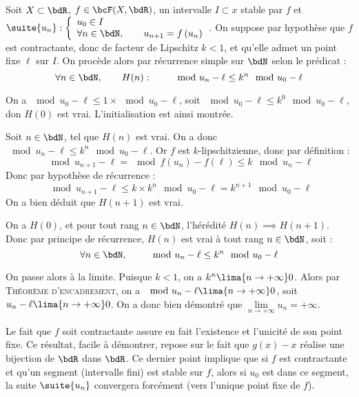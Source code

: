 \documentclass[a4paper,french,bookmarks]{article}
\begin{document}
\begin{nproof}
    Soit $X \subset \bdR$, $f \in \bcF(X, \bdR)$, un intervalle $I \subset x$ stable par $f$ et $\suite{u_n} : \left\lbrace\begin{array}{l}
        u_0 \in I  \\
        \forall n \in \bdN,\qquad u_{n+1} = f\left(u_n\right) 
    \end{array}\right.$. On suppose par hypothèse que $f$ est contractante, donc de facteur de Lipschitz $k < 1$, et qu'elle admet un point fixe $\ell$ sur $I$. On procède alors par récurrence simple sur $\bdN$ selon le prédicat :
    \[ \forall n \in \bdN,\qquad H(n):\qquad \mod{u_n - \ell} \leq k^n\mod{u_0 - \ell}\]
    \begin{enumerate}
        \itt On a $\mod{u_0 - \ell} \leq 1 \times \mod{u_0 - \ell}$, soit $\mod{u_0 - \ell} \leq k^0\mod{u_0 - \ell}$, don $H(0)$ est vrai. L'initialisation est ainsi montrée.
        
        \itt Soit $n \in \bdN$, tel que $H(n)$ est vrai. On a donc $\mod{u_n - \ell} \leq k^n\mod{u_0 - \ell}$. Or $f$ est $k$-lipschitzienne, donc par définition :
        \[ \mod{u_{n+1} - \ell} = \mod{f\left(u_n\right) - f(\ell)} \leq k\mod{u_n - \ell}\]
        Donc par hypothèse de récurrence :
        \[ \mod{u_{n+1} - \ell} \leq k\times k^n\mod{u_0 - \ell} = k^{n+1}\mod{u_0 - \ell}\]
        On a bien déduit que $H(n+1)$ est vrai.
        
        \itt On a $H(0)$, et pour tout rang $n \in \bdN$, l'hérédité $H(n) \implies H(n+1)$. Donc par principe de récurrence, $H(n)$ est vrai à tout rang $n \in \bdN$, soit :
        \[ \forall n \in \bdN, \qquad \mod{u_n - \ell} \leq k^n\mod{u_0 - \ell}\]
    \end{enumerate}
    
    On passe alors à la limite. Puisque $k < 1$, on a $k^n \lima{n \to +\infty} 0$. Alors par \textsc{Théorème d'encadrement}, on a $\mod{u_n - \ell} \lima{n \to +\infty} 0$, soit $u_n - \ell \lima{n \to +\infty} 0$. On a donc bien démontré que $\lim\limits_{n \to +\infty} u_n = +\infty$.
\end{nproof}

Le fait que $f$ soit contractante assure en fait l'existence et l'unicité de son point fixe. Ce résultat, facile à démontrer, repose sur le fait que $g(x) - x$ réalise une bijection de $\bdR$ dans $\bdR$. Ce dernier point  implique que si $f$ est contractante et qu'un segment (intervalle fini) est stable sur $f$, alors si $u_0$ est dans ce segment, la suite $\suite{u_n}$ convergera forcément (vers l'unique point fixe de $f$).
\end{document}
